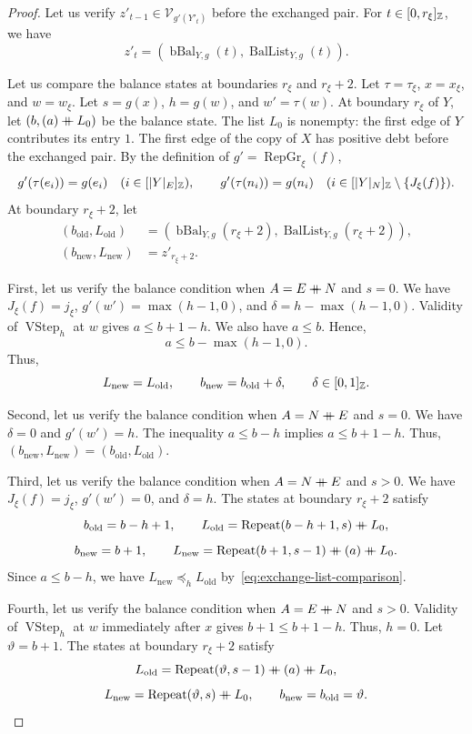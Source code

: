 \begin{proof}
Let us verify $z'_{t-1}\in\mathcal V_{g'(Y'_t)}$ before the exchanged pair.
For $t\in[0,r_\xi]_{\mathbb Z}$, we have
\[
 z'_t=(\operatorname{bBal}_{Y,g}(t),\operatorname{BalList}_{Y,g}(t)).
\]

Let us compare the balance states at boundaries $r_\xi$ and $r_\xi+2$.
Let $\tau=\tau_\xi$, $x=x_\xi$, and $w=w_\xi$.
Let $s=g(x)$, $h=g(w)$, and $w'=\tau(w)$.
At boundary $r_\xi$ of $Y$, let $(b,(a)\mathbin{+\mkern-10mu+} L_0)$ be the balance state.
The list $L_0$ is nonempty: the first edge of $Y$ contributes its entry $1$. The first edge of the copy of $X$ has positive debt before the exchanged pair.
By the definition of $g'=\operatorname{RepGr}_\xi(f)$,
\[
 g'(\tau(e_i))=g(e_i)\quad(i\in[|Y|_E]_{\mathbb Z}),\qquad
 g'(\tau(n_i))=g(n_i)\quad(i\in[|Y|_N]_{\mathbb Z}\setminus\{J_\xi(f)\}).
\]
At boundary $r_\xi+2$, let
\[
\begin{aligned}
 (b_{\mathrm{old}},L_{\mathrm{old}})&=
 (\operatorname{bBal}_{Y,g}(r_\xi+2),\operatorname{BalList}_{Y,g}(r_\xi+2)),\\
 (b_{\mathrm{new}},L_{\mathrm{new}})&=z'_{r_\xi+2}.
\end{aligned}
\]

First, let us verify the balance condition when $A=E\mathbin{+\mkern-10mu+} N$ and $s=0$.
We have $J_\xi(f)=j_\xi$, $g'(w')=\max(h-1,0)$, and $\delta=h-\max(h-1,0)$.
Validity of $\operatorname{VStep}_h$ at $w$ gives $a\le b+1-h$.
We also have $a\le b$.
Hence,
\[
 a\le b-\max(h-1,0).
\]
Thus,
\[
 L_{\mathrm{new}}=L_{\mathrm{old}},\qquad
 b_{\mathrm{new}}=b_{\mathrm{old}}+\delta,\qquad \delta\in[0,1]_{\mathbb Z}.
\]

Second, let us verify the balance condition when $A=N\mathbin{+\mkern-10mu+} E$ and $s=0$.
We have $\delta=0$ and $g'(w')=h$.
The inequality $a\le b-h$ implies $a\le b+1-h$.
Thus, $(b_{\mathrm{new}},L_{\mathrm{new}})=(b_{\mathrm{old}},L_{\mathrm{old}})$.

Third, let us verify the balance condition when $A=N\mathbin{+\mkern-10mu+} E$ and $s>0$.
We have $J_\xi(f)=j_\xi$, $g'(w')=0$, and $\delta=h$.
The states at boundary $r_\xi+2$ satisfy
\[
 b_{\mathrm{old}}=b-h+1,\qquad
 L_{\mathrm{old}}=\operatorname{Repeat}(b-h+1,s)\mathbin{+\mkern-10mu+} L_0,
\]
\[
 b_{\mathrm{new}}=b+1,\qquad
 L_{\mathrm{new}}=\operatorname{Repeat}(b+1,s-1)\mathbin{+\mkern-10mu+}(a)\mathbin{+\mkern-10mu+} L_0.
\]
Since $a\le b-h$, we have $L_{\mathrm{new}}\preceq_h L_{\mathrm{old}}$ by~\eqref{eq:exchange-list-comparison}.

Fourth, let us verify the balance condition when $A=E\mathbin{+\mkern-10mu+} N$ and $s>0$.
Validity of $\operatorname{VStep}_h$ at $w$ immediately after $x$ gives $b+1\le b+1-h$. Thus, $h=0$.
Let $\vartheta=b+1$.
The states at boundary $r_\xi+2$ satisfy
\[
 L_{\mathrm{old}}=\operatorname{Repeat}(\vartheta,s-1)\mathbin{+\mkern-10mu+}(a)\mathbin{+\mkern-10mu+} L_0,
\]
\[
 L_{\mathrm{new}}=\operatorname{Repeat}(\vartheta,s)\mathbin{+\mkern-10mu+} L_0,\qquad
 b_{\mathrm{new}}=b_{\mathrm{old}}=\vartheta.
\]


\end{proof}
